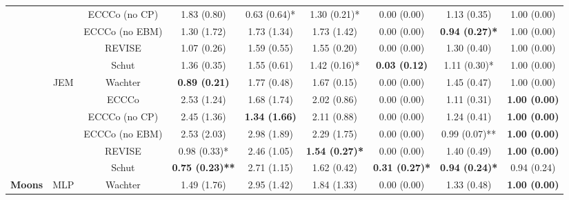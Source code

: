 \begin{table}
{\begin{tabular}[t]{>{}c|c|c|c|c|c|c|c|c}
 &  & ECCCo (no CP) & 1.83 (0.80) & 0.63 (0.64)* & 1.30 (0.21)* & 0.00 (0.00) & 1.13 (0.35) & 1.00 (0.00)\\

 &  & ECCCo (no EBM) & 1.30 (1.72) & 1.73 (1.34) & 1.73 (1.42) & 0.00 (0.00) & \textbf{0.94 (0.27)*} & 1.00 (0.00)\\

 &  & REVISE & 1.07 (0.26) & 1.59 (0.55) & 1.55 (0.20) & 0.00 (0.00) & 1.30 (0.40) & 1.00 (0.00)\\

 &  & Schut & 1.36 (0.35) & 1.55 (0.61) & 1.42 (0.16)* & \textbf{0.03 (0.12)} & 1.11 (0.30)* & 1.00 (0.00)\\

 & \multirow{-6}{*}{\centering\arraybackslash JEM} & Wachter & \textbf{0.89 (0.21)} & 1.77 (0.48) & 1.67 (0.15) & 0.00 (0.00) & 1.45 (0.47) & 1.00 (0.00)\\
\cline{2-9}
 &  & ECCCo & 2.53 (1.24) & 1.68 (1.74) & 2.02 (0.86) & 0.00 (0.00) & 1.11 (0.31) & \textbf{1.00 (0.00)}\\

 &  & ECCCo (no CP) & 2.45 (1.36) & \textbf{1.34 (1.66)} & 2.11 (0.88) & 0.00 (0.00) & 1.24 (0.41) & \textbf{1.00 (0.00)}\\

 &  & ECCCo (no EBM) & 2.53 (2.03) & 2.98 (1.89) & 2.29 (1.75) & 0.00 (0.00) & 0.99 (0.07)** & \textbf{1.00 (0.00)}\\

 &  & REVISE & 0.98 (0.33)* & 2.46 (1.05) & \textbf{1.54 (0.27)*} & 0.00 (0.00) & 1.40 (0.49) & \textbf{1.00 (0.00)}\\

 &  & Schut & \textbf{0.75 (0.23)**} & 2.71 (1.15) & 1.62 (0.42) & \textbf{0.31 (0.27)*} & \textbf{0.94 (0.24)*} & 0.94 (0.24)\\

\multirow{-12}{*}{\centering\arraybackslash \textbf{Moons}} & \multirow{-6}{*}{\centering\arraybackslash MLP} & Wachter & 1.49 (1.76) & 2.95 (1.42) & 1.84 (1.33) & 0.00 (0.00) & 1.33 (0.48) & \textbf{1.00 (0.00)}\\
\hline
\end{tabular}}
\end{table}
